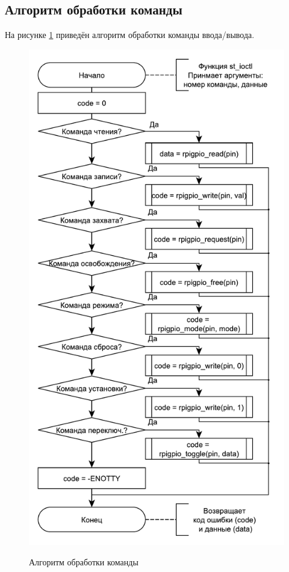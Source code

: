 \subsection{Алгоритм обработки команды}
На рисунке \ref{alg:command} приведён алгоритм обработки команды ввода/вывода.
\begin{figure}[h!] 
	\begin{center}
		{\includegraphics[scale=0.7, angle=0]{img/command.pdf}}
		\caption{Алгоритм обработки команды}
		\label{alg:command}
	\end{center}
\end{figure}
\pagebreak

